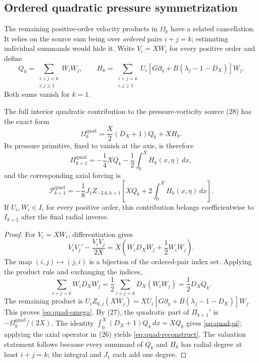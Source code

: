 \subsection{Ordered quadratic pressure symmetrization}
\label{subsec:quadratic-pressure}

The remaining positive-order velocity products in $\Omega_k$ have a
related cancellation. It relies on the source sum being over
\emph{ordered} pairs $i+j=k$; estimating individual summands would
hide it. Write $V_i=XW_i$ for every positive order and define
\[
 Q_k=\sum_{\substack{i+j=k\\i,j\ge1}}W_iW_j,
 \qquad H_k=\sum_{\substack{i+j=k\\i,j\ge1}}
 U_i\left[G\partial_\eta+B(\lambda_j-1-D_X)\right]W_j.
\]
Both sums vanish for $k=1$.

\begin{proposition}
\label{prop:quad-pressure}
The full interior quadratic contribution to the pressure-vorticity
source (28) has the exact form
\begin{equation}\label{eq:quad-omega}
 \Omega_k^{\mathrm{quad}}=\frac X2(D_X+1)Q_k+XH_k.
\end{equation}
Its pressure primitive, fixed to vanish at the axis, is therefore
\begin{equation}\label{eq:quad-pi}
 \Pi_{k+1}^{\mathrm{quad}}=-\frac14XQ_k
                         -\frac12\int_0^XH_k(x,\eta)\,dx,
\end{equation}
and the corresponding axial forcing is
\begin{equation}\label{eq:quad-reconstruct}
 \mathcal P_{k+1}^{\mathrm{quad}}
 =-\frac18J_1Z_{-2A,k+1}
   \left[XQ_k+2\int_0^XH_k(x,\eta)\,dx\right].
\end{equation}
If $U_i,W_i\in I_i$ for every positive order, this contribution
belongs coefficientwise to $I_{k+2}$ after the final radial inverse.
\end{proposition}
\begin{proof}
For $V_i=XW_i$, differentiation gives
\[
 V_iV_j'-\frac{V_iV_j}{2X}
 =X\left(W_iD_XW_j+\frac12W_iW_j\right).
\]
The map $(i,j)\mapsto(j,i)$ is a bijection of the ordered-pair
index set. Applying the product rule and exchanging the indices,
\[
 \sum_{i+j=k}W_iD_XW_j
 =\frac12\sum_{i+j=k}D_X(W_iW_j)
 =\frac12D_XQ_k.
\]
The remaining product is
$U_iZ_{0,j}(XW_j)=XU_i[G\partial_\eta+
B(\lambda_j-1-D_X)]W_j$. This proves
\eqref{eq:quad-omega}. By (27), the quadratic part of
$\Pi_{k+1}'$ is $-\Omega_k^{\mathrm{quad}}/(2X)$.
The identity
$\int_0^X(D_X+1)Q_k\,dx=XQ_k$ gives
\eqref{eq:quad-pi}; applying the axial operator in (26) yields
\eqref{eq:quad-reconstruct}. The valuation statement follows
because every summand of $Q_k$ and $H_k$ has radial degree
at least $i+j=k$; the integral and $J_1$ each add one degree.
\end{proof}

